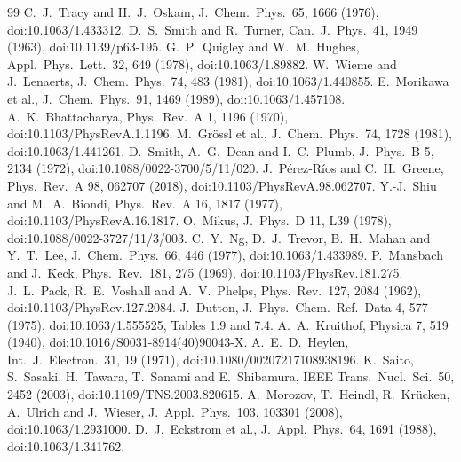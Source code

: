 \documentclass[11pt]{article}
\begin{document}
\begin{thebibliography}{99}
 C.~J.~Tracy and H.~J.~Oskam, J.\ Chem.\ Phys.\ 65, 1666 (1976), doi:10.1063/1.433312.
 D.~S.~Smith and R.~Turner, Can.\ J.\ Phys.\ 41, 1949 (1963), doi:10.1139/p63-195.
 G.~P.~Quigley and W.~M.~Hughes, Appl.\ Phys.\ Lett.\ 32, 649 (1978), doi:10.1063/1.89882.
 W.~Wieme and J.~Lenaerts, J.\ Chem.\ Phys.\ 74, 483 (1981), doi:10.1063/1.440855.
 E.~Morikawa et al., J.\ Chem.\ Phys.\ 91, 1469 (1989), doi:10.1063/1.457108.
 A.~K.~Bhattacharya, Phys.\ Rev.\ A 1, 1196 (1970), doi:10.1103/PhysRevA.1.1196.
 M.~Gr\"ossl et al., J.\ Chem.\ Phys.\ 74, 1728 (1981), doi:10.1063/1.441261.
 D.~Smith, A.~G.~Dean and I.~C.~Plumb, J.\ Phys.\ B 5, 2134 (1972), doi:10.1088/0022-3700/5/11/020.
 J.~P\'erez-R\'ios and C.~H.~Greene, Phys.\ Rev.\ A 98, 062707 (2018), doi:10.1103/PhysRevA.98.062707.
 Y.-J.~Shiu and M.~A.~Biondi, Phys.\ Rev.\ A 16, 1817 (1977), doi:10.1103/PhysRevA.16.1817.
 O.~Mikus, J.\ Phys.\ D 11, L39 (1978), doi:10.1088/0022-3727/11/3/003.
 C.~Y.~Ng, D.~J.~Trevor, B.~H.~Mahan and Y.~T.~Lee, J.\ Chem.\ Phys.\ 66, 446 (1977), doi:10.1063/1.433989.
 P.~Mansbach and J.~Keck, Phys.\ Rev.\ 181, 275 (1969), doi:10.1103/PhysRev.181.275.
 J.~L.~Pack, R.~E.~Voshall and A.~V.~Phelps, Phys.\ Rev.\ 127, 2084 (1962), doi:10.1103/PhysRev.127.2084.
 J.~Dutton, J.\ Phys.\ Chem.\ Ref.\ Data 4, 577 (1975), doi:10.1063/1.555525, Tables 1.9 and 7.4.
 A.~A.~Kruithof, Physica 7, 519 (1940), doi:10.1016/S0031-8914(40)90043-X.
 A.~E.~D.~Heylen, Int.\ J.\ Electron.\ 31, 19 (1971), doi:10.1080/00207217108938196.
 K.~Saito, S.~Sasaki, H.~Tawara, T.~Sanami and E.~Shibamura, IEEE Trans.\ Nucl.\ Sci.\ 50, 2452 (2003), doi:10.1109/TNS.2003.820615.
 A.~Morozov, T.~Heindl, R.~Kr\"ucken, A.~Ulrich and J.~Wieser, J.\ Appl.\ Phys.\ 103, 103301 (2008), doi:10.1063/1.2931000.
 D.~J.~Eckstrom et al., J.\ Appl.\ Phys.\ 64, 1691 (1988), doi:10.1063/1.341762.
\end{thebibliography}
\end{document}

